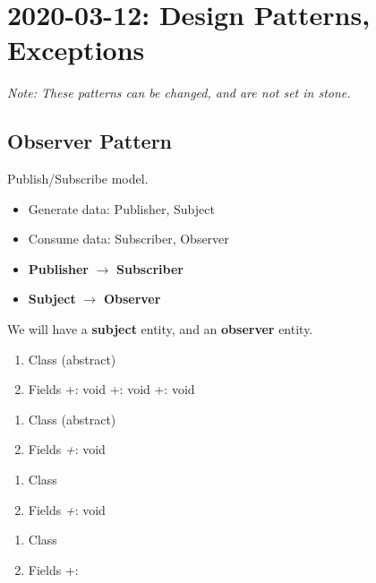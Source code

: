 \section{2020-03-12: Design Patterns, Exceptions}
\emph{Note: These patterns can be changed, and are not set in stone.}
\subsection{Observer Pattern}
Publish/Subscribe model.
\begin{itemize}
    \item Generate data: Publisher, Subject
    \item Consume data: Subscriber, Observer
\end{itemize}
\begin{itemize}
    \item \textbf{Publisher} $ \rightarrow $ \textbf{Subscriber}
    \item \textbf{Subject} $ \rightarrow $ \textbf{Observer}
\end{itemize}
We will have a \textbf{subject} entity, and an \textbf{observer} entity.

\begin{enumerate}[(1)]
    \item Class
          \subitem {} (abstract)
    \item Fields
          \subitem +: void
          \subitem +: void
          \subitem +: void
\end{enumerate}
\begin{enumerate}[(1)]
    \item Class
          \subitem {} (abstract)
    \item Fields
          \subitem \emph{+}: void
\end{enumerate}

\begin{enumerate}[(1)]
    \item Class
          \subitem {}
    \item Fields
          \subitem \emph{+}: void
\end{enumerate}

\begin{enumerate}[(1)]
    \item Class
          \subitem {}
    \item Fields
          \subitem +:
\end{enumerate}

